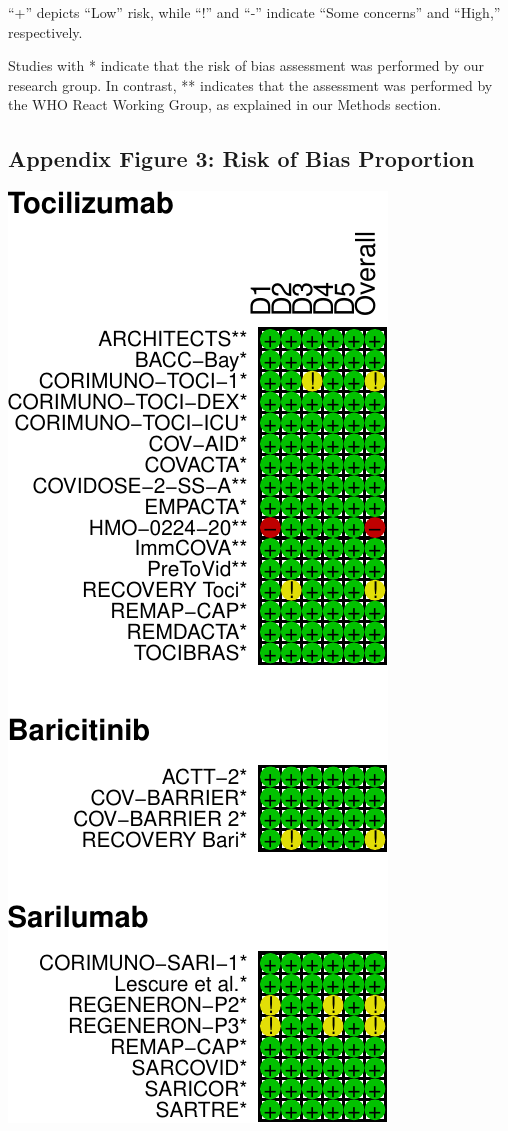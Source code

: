 \documentclass[
  12pt,
]{article}
\begin{document}
``+'' depicts ``Low'' risk, while ``!'' and ``-'' indicate ``Some
concerns'' and ``High,'' respectively.

Studies with * indicate that the risk of bias assessment was performed
by our research group. In contrast, ** indicates that the assessment was
performed by the WHO React Working Group, as explained in our Methods
section.

\hypertarget{appendix-figure-3-risk-of-bias-proportion}{%
\subsection{Appendix Figure 3: Risk of Bias
Proportion}\label{appendix-figure-3-risk-of-bias-proportion}}

\begin{center}\includegraphics{supplementary_material_files/figure-latex/unnamed-chunk-6-1} \end{center}
\end{document}

